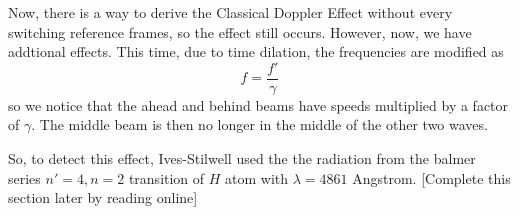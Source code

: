 \documentclass{article}
\begin{document}
\vskip 0.5cm
Now, there is a way to derive the Classical Doppler Effect without every switching reference frames, so the effect still occurs. However, now, we have addtional effects. This time, due to time dilation, the frequencies are modified as 
\[ f = \frac{f'}{\gamma} \]
so we notice that the ahead and behind beams have speeds multiplied by a factor of $\gamma$. The middle beam is then no longer in the middle of the other two waves.

\vskip 0.5cm
So, to detect this effect, Ives-Stilwell used the the radiation from the balmer series $n' = 4, n = 2$ transition of $H$ atom with $\lambda = 4861$ Angstrom. [Complete this section later by reading online]

\end{document}
